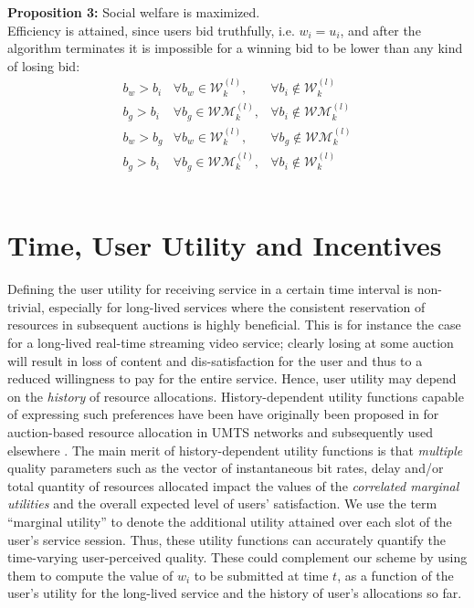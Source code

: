 \documentclass[a4paper]{article}
\begin{document}
{\bf Proposition 3:} Social welfare is maximized.
\\
Efficiency is attained, since users bid truthfully, 
i.e. $w_i = u_i$, and after the algorithm terminates it is impossible for
a winning bid to be lower than any kind of losing bid:
\begin{eqnarray}
b_w > b_i &\forall b_w \in \mathcal{W}_k^{(l)},  &\forall b_i \notin \mathcal{W}_k^{(l)}\\
b_g > b_i &\forall b_g \in \mathcal{WM}_k^{(l)}, &\forall b_i \notin \mathcal{WM}_k^{(l)}\\
b_w > b_g &\forall b_w \in \mathcal{W}_k^{(l)},  &\forall b_g \notin \mathcal{WM}_k^{(l)}\\
b_g > b_i &\forall b_g \in \mathcal{WM}_k^{(l)}, &\forall b_i \notin \mathcal{W}_k^{(l)}\end{eqnarray}
\\


\section{Time, User Utility and Incentives}\label{sec:time}

Defining the user utility for receiving service in
a certain time interval is non-trivial, especially for
long-lived services where the consistent reservation of resources in 
subsequent auctions is highly beneficial. This is for instance the case
for a long-lived real-time streaming video service; clearly losing at some 
auction will result in loss of content and dis-satisfaction for the user
and thus to a reduced willingness to pay for the entire service.
Hence, user utility may depend on the {\em history} of resource allocations. 
History-dependent utility functions capable of expressing such preferences
have been have originally been 
proposed in \cite{ATHENA} for auction-based resource allocation in UMTS networks 
and subsequently used elsewhere \cite{HERA, Bruno}. 
The main merit of history-dependent utility functions is
that {\em multiple} quality parameters such as the vector of instantaneous
bit rates, delay and/or total quantity of resources
allocated impact the values of the {\em correlated marginal utilities}
and the overall expected level of users' satisfaction.
We use the term ``marginal utility'' to denote the 
additional utility attained over each slot of the user's service session.
Thus, these utility functions can accurately quantify the
time-varying user-perceived quality.
These could complement
our scheme by using them to compute the value of $w_i$ 
to be submitted at time $t$, as a function of the user's utility
for the long-lived service and the history of user's allocations so far.
\end{document}
